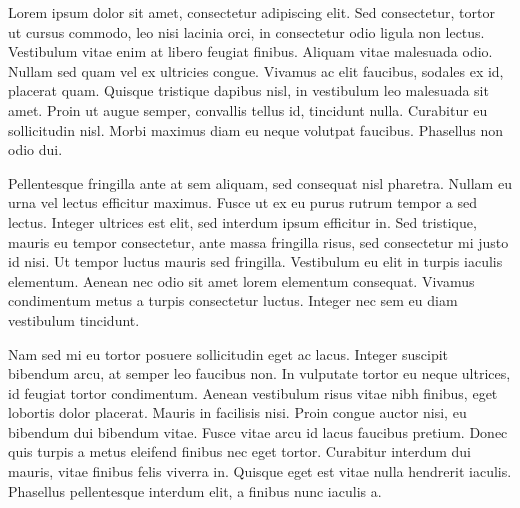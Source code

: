 Lorem ipsum dolor sit amet, consectetur adipiscing elit. Sed consectetur, tortor ut cursus commodo, leo nisi lacinia orci, in consectetur odio ligula non lectus. Vestibulum vitae enim at libero feugiat finibus. Aliquam vitae malesuada odio. Nullam sed quam vel ex ultricies congue. Vivamus ac elit faucibus, sodales ex id, placerat quam. Quisque tristique dapibus nisl, in vestibulum leo malesuada sit amet. Proin ut augue semper, convallis tellus id, tincidunt nulla. Curabitur eu sollicitudin nisl. Morbi maximus diam eu neque volutpat faucibus. Phasellus non odio dui.

Pellentesque fringilla ante at sem aliquam, sed consequat nisl pharetra. Nullam eu urna vel lectus efficitur maximus. Fusce ut ex eu purus rutrum tempor a sed lectus. Integer ultrices est elit, sed interdum ipsum efficitur in. Sed tristique, mauris eu tempor consectetur, ante massa fringilla risus, sed consectetur mi justo id nisi. Ut tempor luctus mauris sed fringilla. Vestibulum eu elit in turpis iaculis elementum. Aenean nec odio sit amet lorem elementum consequat. Vivamus condimentum metus a turpis consectetur luctus. Integer nec sem eu diam vestibulum tincidunt.

Nam sed mi eu tortor posuere sollicitudin eget ac lacus. Integer suscipit bibendum arcu, at semper leo faucibus non. In vulputate tortor eu neque ultrices, id feugiat tortor condimentum. Aenean vestibulum risus vitae nibh finibus, eget lobortis dolor placerat. Mauris in facilisis nisi. Proin congue auctor nisi, eu bibendum dui bibendum vitae. Fusce vitae arcu id lacus faucibus pretium. Donec quis turpis a metus eleifend finibus nec eget tortor. Curabitur interdum dui mauris, vitae finibus felis viverra in. Quisque eget est vitae nulla hendrerit iaculis. Phasellus pellentesque interdum elit, a finibus nunc iaculis a.